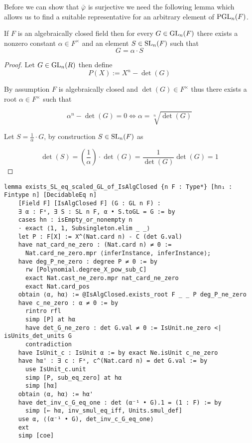 Before we can show that $\bar{\varphi}$ is surjective we need the following lemma which allows us to find a suitable representative for an arbitrary element of $\operatorname{PGL}_n(F)$.

\begin{lemma}
\label{exists_SL_eq_scaled_GL_of_IsAlgClosed}
\leanok
If $F$ is an algebraically closed field then for every $G \in \operatorname{GL}_n(F)$ there exists a nonzero constant $\alpha \in F^\times$ and an element $S \in \operatorname{SL}_n(F)$ such that 
\begin{equation*}
    G = \alpha \cdot S
\end{equation*}
\end{lemma}

\begin{proof}
\leanok
Let $G \in \operatorname{GL}_n(R)$ then define
\begin{equation*}
    P(X) := X^n - \det(G)
\end{equation*}

By assumption $F$ is algebraically closed and $\det(G) \in F^\times$ thus there exists a root $\alpha \in F^\times$ such that 

\begin{equation*}
    \alpha^n - \det(G) = 0 \iff \alpha = \sqrt[n]{\det(G)} 
\end{equation*}

Let $S = \frac{1}{\alpha} \cdot G$, by construction $S \in \operatorname{SL}_n(F)$ as 

\begin{equation*}
    \det(S) = \left(\frac{1}{\alpha}\right) \cdot \det(G) = \frac{1}{\det(G)} \det(G) = 1
\end{equation*}
\end{proof}
\begin{footnotesize}
\begin{verbatim}
lemma exists_SL_eq_scaled_GL_of_IsAlgClosed {n F : Type*} [hn₁ : Fintype n] [DecidableEq n]
    [Field F] [IsAlgClosed F] (G : GL n F) :
    ∃ α : Fˣ, ∃ S : SL n F, α • S.toGL = G := by
    cases hn : isEmpty_or_nonempty n
    · exact ⟨1, 1, Subsingleton.elim _ _⟩
    let P : F[X] := X^(Nat.card n) - C (det G.val)
    have nat_card_ne_zero : (Nat.card n) ≠ 0 :=
      Nat.card_ne_zero.mpr ⟨inferInstance, inferInstance⟩;
    have deg_P_ne_zero : degree P ≠ 0 := by
      rw [Polynomial.degree_X_pow_sub_C]
      exact Nat.cast_ne_zero.mpr nat_card_ne_zero
      exact Nat.card_pos
    obtain ⟨α, hα⟩ := @IsAlgClosed.exists_root F _ _ P deg_P_ne_zero
    have c_ne_zero : α ≠ 0 := by
      rintro rfl
      simp [P] at hα
      have det_G_ne_zero : det G.val ≠ 0 := IsUnit.ne_zero <| isUnits_det_units G
      contradiction
    have IsUnit_c : IsUnit α := by exact Ne.isUnit c_ne_zero
    have hα' : ∃ c : Fˣ, c^(Nat.card n) = det G.val := by
      use IsUnit_c.unit
      simp [P, sub_eq_zero] at hα
      simp [hα]
    obtain ⟨α, hα⟩ := hα'
    have det_inv_c_G_eq_one : det (α⁻¹ • G).1 = (1 : F) := by
      simp [← hα, inv_smul_eq_iff, Units.smul_def]
    use α, ⟨(α⁻¹ • G), det_inv_c_G_eq_one⟩
    ext
    simp [coe]
\end{verbatim}
\end{footnotesize}

